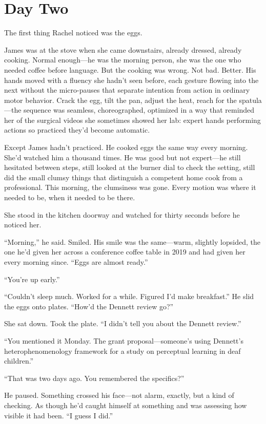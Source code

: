 \chapter{Day Two}

The first thing Rachel noticed was the eggs.

James was at the stove when she came downstairs, already dressed, already cooking. Normal enough---he was the morning person, she was the one who needed coffee before language. But the cooking was wrong. Not bad. Better. His hands moved with a fluency she hadn't seen before, each gesture flowing into the next without the micro-pauses that separate intention from action in ordinary motor behavior. Crack the egg, tilt the pan, adjust the heat, reach for the spatula---the sequence was seamless, choreographed, optimized in a way that reminded her of the surgical videos she sometimes showed her lab: expert hands performing actions so practiced they'd become automatic.

Except James hadn't practiced. He cooked eggs the same way every morning. She'd watched him a thousand times. He was good but not expert---he still hesitated between steps, still looked at the burner dial to check the setting, still did the small clumsy things that distinguish a competent home cook from a professional. This morning, the clumsiness was gone. Every motion was where it needed to be, when it needed to be there.

She stood in the kitchen doorway and watched for thirty seconds before he noticed her.

``Morning,'' he said. Smiled. His smile was the same---warm, slightly lopsided, the one he'd given her across a conference coffee table in 2019 and had given her every morning since. ``Eggs are almost ready.''

``You're up early.''

``Couldn't sleep much. Worked for a while. Figured I'd make breakfast.'' He slid the eggs onto plates. ``How'd the Dennett review go?''

She sat down. Took the plate. ``I didn't tell you about the Dennett review.''

``You mentioned it Monday. The grant proposal---someone's using Dennett's heterophenomenology framework for a study on perceptual learning in deaf children.''

``That was two days ago. You remembered the specifics?''

He paused. Something crossed his face---not alarm, exactly, but a kind of checking. As though he'd caught himself at something and was assessing how visible it had been. ``I guess I did.''

